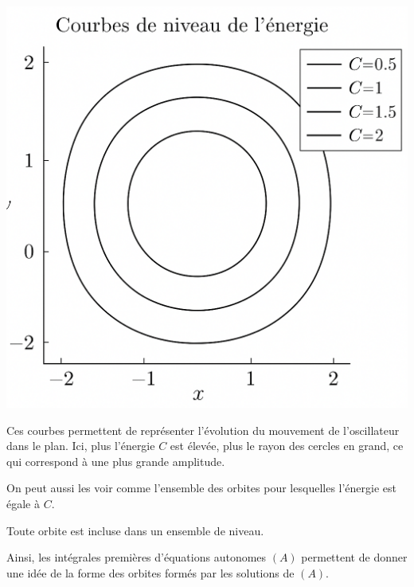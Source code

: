 \begin{example}
    \begin{center}
        \begin{minipage}{0.35\textwidth}
            \centering
            \includegraphics[scale=0.1]{./images/courbes_niveaux.png}
        \end{minipage}
        \hfill 
        \begin{minipage}{0.55\textwidth}
            Ces courbes permettent de représenter l'évolution du mouvement de l'oscillateur dans le plan. 
            Ici, plus l'énergie $C$ est élevée, plus le rayon des cercles en grand, 
            ce qui correspond à une plus grande amplitude. 

            On peut aussi les voir comme l'ensemble des orbites pour lesquelles l'énergie est égale à $C$. 
        \end{minipage}
    \end{center}
\end{example}

\begin{prop}
    Toute orbite est incluse dans un ensemble de niveau. 
\end{prop}

Ainsi, les intégrales premières d'équations autonomes $(A)$ permettent de donner une idée de la forme des orbites formés
par les solutions de $(A)$. 

